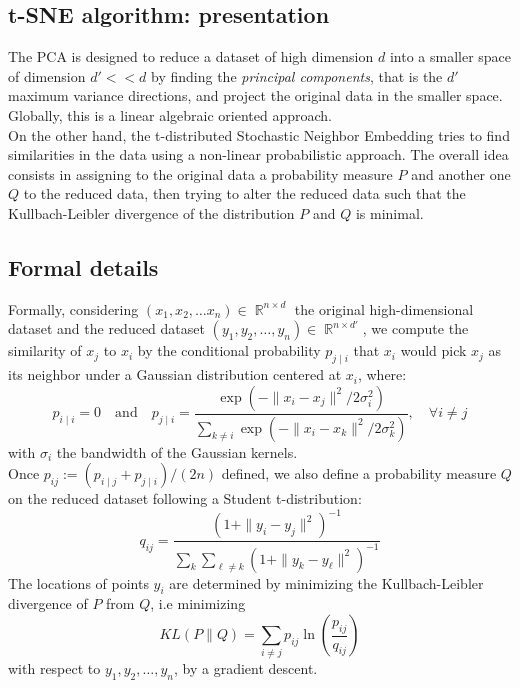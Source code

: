 \documentclass[]{article}
\DeclareMathOperator*{\R}{\mathbb{R}}
\begin{document}
\subsection{t-SNE algorithm: presentation}
The PCA is designed to reduce a dataset of high dimension $d$ into a smaller space of dimension $d'<\!<d$ by finding the \textit{principal components}, that is the $d'$ maximum variance directions, and project the original data in the smaller space. Globally, this is a linear algebraic oriented approach.\\
On the other hand, the t-distributed Stochastic Neighbor Embedding tries to find similarities in the data using a non-linear probabilistic approach. The overall idea consists in assigning to the original data a probability measure $P$ and another one $Q$ to the reduced data, then trying to alter the reduced data such that the Kullbach-Leibler divergence of the distribution $P$ and $Q$ is minimal.
\subsection{Formal details}
Formally, considering $(x_1, x_2,\dots x_n) \in \R^{n\times d}$ the original high-dimensional dataset and the reduced dataset $(y_1,y_2,\dots, y_n)\in \R^{n\times d'}$, we compute the similarity of $x_j$ to $x_i$ by the conditional probability $p_{j\mid i}$ that $x_i$ would pick $x_j$ as its neighbor under a Gaussian distribution centered at $x_i$, where:
\begin{equation}
	p_{i\mid i} = 0\quad \text{and}\quad
	p_{j\mid i} = \frac{\exp(-\|x_i - x_j\|^2/2\sigma_i^2)}{\sum_{k\ne i}\exp(-\|x_i - x_k\|^2/2\sigma_k^2)}, \quad \forall i\ne j
\end{equation}
with $\sigma_i$ the bandwidth of the Gaussian kernels.\\
Once $p_{ij} := (p_{i\mid j} + p_{j\mid i})/(2n)$ defined, we also define a probability measure $Q$ on the reduced dataset following a Student t-distribution:
\begin{equation}
	q_{ij} = \frac{(1+\|y_i-y_j\|^2)^{-1}}{\sum_k \sum_{\ell \ne k}	(1+\|y_k-y_{\ell}\|^2)^{-1}}
\end{equation}
The locations of points $y_i$ are determined by minimizing the Kullbach-Leibler divergence of $P$ from $Q$, i.e minimizing
\begin{equation}
	KL(P\|Q) = \sum_{i\ne j}p_{ij} \ln\left(\frac{p_{ij}}{q_{ij}}\right)
\end{equation}
with respect to $y_1,y_2,\dots, y_n$, by a gradient descent.\\
\end{document}
